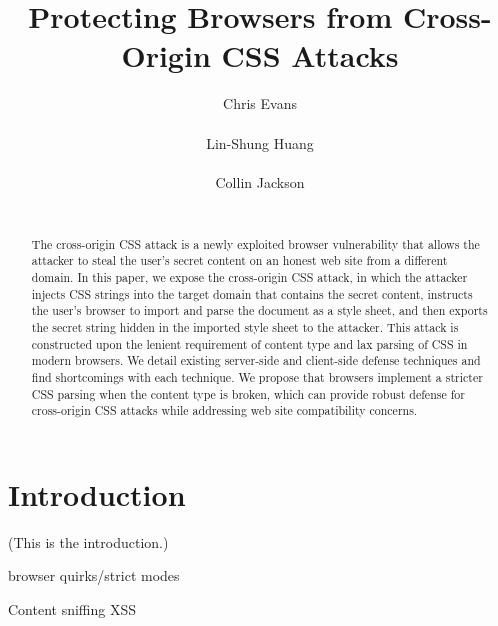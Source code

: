 \documentclass{acm_proc_article-sp}
\begin{document}
\title{Protecting Browsers from Cross-Origin CSS Attacks}

\author{
\alignauthor
Chris Evans\\
      \\
\alignauthor
Lin-Shung Huang\\
      \\
\alignauthor
Collin Jackson\\
      \\
}

\maketitle
\begin{abstract}
The cross-origin CSS attack is a newly exploited browser vulnerability that allows the attacker to steal the user's secret content on an honest web site from a different domain. In this paper, we expose the cross-origin CSS attack, in which the attacker injects CSS strings into the target domain that contains the secret content, instructs the user's browser to import and parse the document as a style sheet, and then exports the secret string hidden in the imported style sheet to the attacker. This attack is constructed upon the lenient requirement of content type and lax parsing of CSS in modern browsers. We detail existing server-side and client-side defense techniques and find shortcomings with each technique. We propose that browsers implement a stricter CSS parsing when the content type is broken, which can provide robust defense for cross-origin CSS attacks while addressing web site compatibility concerns.
\end{abstract}




\section{Introduction}
(This is the introduction.)

browser quirks/strict modes

Content sniffing XSS\cite{securecontentsniffing}
\end{document}
